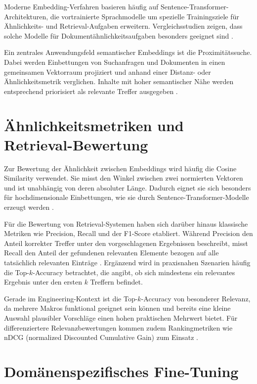 Moderne Embedding-Verfahren basieren häufig auf Sentence-Transformer-Architekturen, die vortrainierte Sprachmodelle um spezielle Trainingsziele für Ähnlichkeits- und Retrieval-Aufgaben erweitern. Vergleichsstudien zeigen, dass solche Modelle für Dokumentähnlichkeitsaufgaben besonders geeignet sind \cite{khosla_comparative_2025}. 

Ein zentrales Anwendungsfeld semantischer Embeddings ist die Proximitätssuche. Dabei werden Einbettungen von Suchanfragen und Dokumenten in einen gemeinsamen Vektorraum projiziert und anhand einer Distanz- oder Ähnlichkeitsmetrik verglichen. Inhalte mit hoher semantischer Nähe werden entsprechend priorisiert als relevante Treffer ausgegeben \cite{gower}.

\section{Ähnlichkeitsmetriken und Retrieval-Bewertung}

Zur Bewertung der Ähnlichkeit zwischen Embeddings wird häufig die Cosine Similarity verwendet. Sie misst den Winkel zwischen zwei normierten Vektoren und ist unabhängig von deren absoluter Länge. Dadurch eignet sie sich besonders für hochdimensionale Einbettungen, wie sie durch Sentence-Transformer-Modelle erzeugt werden \cite{mishra_similarity_2020}.

Für die Bewertung von Retrieval-Systemen haben sich darüber hinaus klassische Metriken wie Precision, Recall und der F1-Score etabliert. Während Precision den Anteil korrekter Treffer unter den vorgeschlagenen Ergebnissen beschreibt, misst Recall den Anteil der gefundenen relevanten Elemente bezogen auf alle tatsächlich relevanten Einträge \cite{lp_llm_2026}. Ergänzend wird in praxisnahen Szenarien häufig die Top-\(k\)-Accuracy betrachtet, die angibt, ob sich mindestens ein relevantes Ergebnis unter den ersten \(k\) Treffern befindet.

Gerade im Engineering-Kontext ist die Top-\(k\)-Accuracy von besonderer Relevanz, da mehrere Makros funktional geeignet sein können und bereits eine kleine Auswahl plausibler Vorschläge einen hohen praktischen Mehrwert bietet. Für differenziertere Relevanzbewertungen kommen zudem Rankingmetriken wie nDCG (normalized Discounted Cumulative Gain) zum Einsatz \cite{lp_llm_2026}.

\section{Domänenspezifisches Fine-Tuning}

